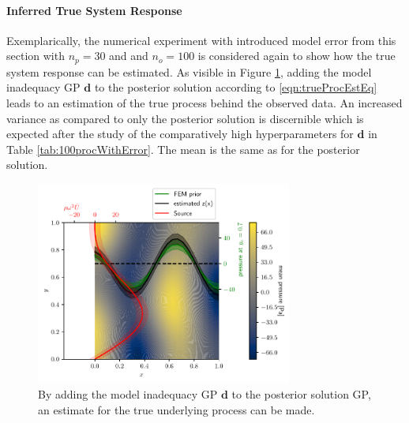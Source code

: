 \documentclass[%
  a4paper,oneside,%
  11pt,%
  smallchapters,
  style=printdev,
  extramargin,
  green,%
  rgb, <cmyk>
  ]{tubsbook}
\begin{document}
\FloatBarrier


\paragraph{Inferred True System Response}
Exemplarically, the numerical experiment with introduced model error from this section with $n_p=30$ and and $n_o=100$ is considered again to show how the true system response can be estimated.
As visible in Figure \ref{fig:InferedTrueResponse2D}, adding the model inadequacy GP $\bm{d}$ to the posterior solution according to \eqref{eqn:trueProcEstEq} leads to an estimation of the true process behind the observed data. An increased variance as compared to only the posterior solution is discernible which is expected after the study of the comparatively high hyperparameters for $\bm{d}$ in Table \ref{tab:100procWithError}. The mean is the same as for the posterior solution.

\begin{figure}[!ht]
\includegraphics[width=0.75\textwidth]{../../Python/Results/2D/100procent_d/SolutionCustomPosterior.pdf}
\centering
\caption[The estimated true response for the 2D Helmholtz example with model error]{By adding the model inadequacy GP $\bm{d}$ to the posterior solution GP, an estimate for the true underlying process can be made.}
\label{fig:InferedTrueResponse2D}
\end{figure}
\FloatBarrier
\end{document}
